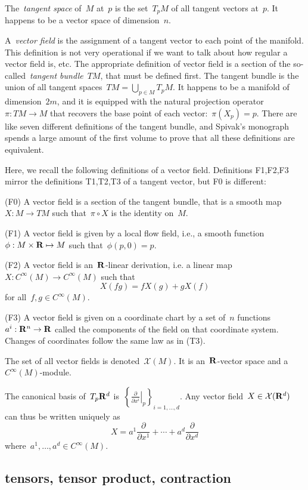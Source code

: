 The~\emph{tangent space} of~$M$ at~$p$ is the set~$T_pM$ of all tangent
vectors at~$p$.  It happens to be a vector space of dimension~$n$.

A~\emph{vector field} is the assignment of a tangent vector to each point of
the manifold.  This definition is not very operational if we want to talk
about how regular a vector field is, etc.  The appropriate definition of
vector field is a section of the so-called~\emph{tangent bundle}~$TM$, that
must be defined first.  The tangent bundle is the union of all tangent
spaces~$TM=\bigcup_{p\in M}T_pM$.  It happens to be a manifold of
dimension~$2m$, and it is equipped with the natural projection
operator~$\pi:TM\to M$ that recovers the base point of each
vector:~$\pi\left(X_p\right)=p$.  There are like seven different definitions
of the tangent bundle, and Spivak's monograph spends a large amount of the
first volume to prove that all these definitions are equivalent.

Here, we recall the following definitions of a vector field.  Definitions
F1,F2,F3 mirror the definitions T1,T2,T3 of a tangent vector, but F0 is
different:

(F0) A vector field is a section of the tangent bundle, that is a
smooth map~$X:M\to TM$ such that~$\pi\circ X$ is the identity on~$M$.

(F1) A vector field is given by a local flow field, i.e., a smooth
function~$\phi:M\times\mathbf{R}\mapsto M$ such that~$\phi(p,0)=p$.

(F2) A vector field is an~$\mathbf{R}$-linear derivation, i.e. a linear
map~$X:C^\infty(M)\to C^\infty(M)$ such that
\[
	X(fg)=fX(g)+gX(f)
\]
for all~$f,g\in C^\infty(M)$.

(F3) A vector field is given on a coordinate chart by a set of~$n$
functions~$a^i:\mathbf{R}^n\to\mathbf{R}$ called the components of the field on that
coordinate system.  Changes of coordinates follow the same law as in (T3).

The set of all vector fields is denoted~$\mathcal{X}(M)$.
It is an~$\mathbf{R}$-vector space and a~$C^\infty(M)$-module.

The canonical basis of~$T_p\mathbf{R}^d$
is~$\displaystyle\left\{\left.\frac{\partial}{\partial
	x^i}\right|_p\right\}_{i=1,\ldots,d}$.  Any vector
	field~$X\in\mathcal{X}(\mathbf{R}^d)$ can thus be written uniquely as
\[
	X =
	a^1\frac{\partial}{\partial x^1}
	+\cdots+
	a^d\frac{\partial}{\partial x^d}
\]
where~$a^1,\ldots,a^d\in C^\infty(M)$.

\subsection{tensors, tensor product, contraction}

